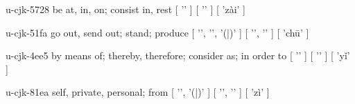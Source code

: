 \begin{multicols}{2}
\lettrine[lines=3]{\cjkgGlue{}}{}\begin{minipage}{0.8\linewidth} u-cjk-5728  be at, in, on; consist in, rest  [ '\cjkgGlue{}' ]  [ '\cjkgGlue{}' ]  [ 'zài' ] \end{minipage}

\lettrine[lines=3]{\cjkgGlue{}}{}\begin{minipage}{0.8\linewidth} u-cjk-51fa  go out, send out; stand; produce  [ '\cjkgGlue{}', '\cjkgGlue{}', '\cjkgGlue{}(\cjkgGlue{}|\cjkgGlue{})' ]  [ '\cjkgGlue{}', '\cjkgGlue{}' ]  [ 'chū' ] \end{minipage}

\lettrine[lines=3]{\cjkgGlue{}}{}\begin{minipage}{0.8\linewidth} u-cjk-4ee5  by means of; thereby, therefore; consider as; in order to  [ '\cjkgGlue{}' ]  [ '\cjkgGlue{}' ]  [ 'yǐ' ] \end{minipage}

\lettrine[lines=3]{\cjkgGlue{}}{}\begin{minipage}{0.8\linewidth} u-cjk-81ea  self, private, personal; from  [ '\cjkgGlue{}', '\cjkgGlue{}(\cjkgGlue{}|\cjkgGlue{})' ]  [ '\cjkgGlue{}', '\cjkgGlue{}' ]  [ 'zì' ] \end{minipage}


\end{multicols}
